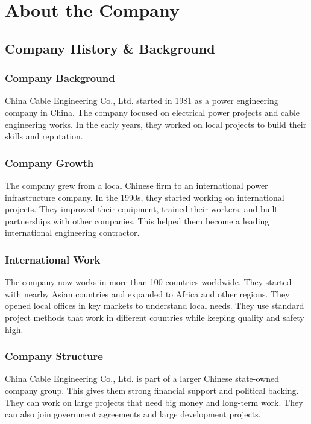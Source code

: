 
\chapter{About the Company}

\section{Company History \& Background}

\subsection{Company Background}
China Cable Engineering Co., Ltd. started in 1981 as a power engineering company in China. The company focused on electrical power projects and cable engineering works. In the early years, they worked on local projects to build their skills and reputation.

\subsection{Company Growth}
The company grew from a local Chinese firm to an international power infrastructure company. In the 1990s, they started working on international projects. They improved their equipment, trained their workers, and built partnerships with other companies. This helped them become a leading international engineering contractor.

\subsection{International Work}
The company now works in more than 100 countries worldwide. They started with nearby Asian countries and expanded to Africa and other regions. They opened local offices in key markets to understand local needs. They use standard project methods that work in different countries while keeping quality and safety high.

\subsection{Company Structure}
China Cable Engineering Co., Ltd. is part of a larger Chinese state-owned company group. This gives them strong financial support and political backing. They can work on large projects that need big money and long-term work. They can also join government agreements and large development projects.

